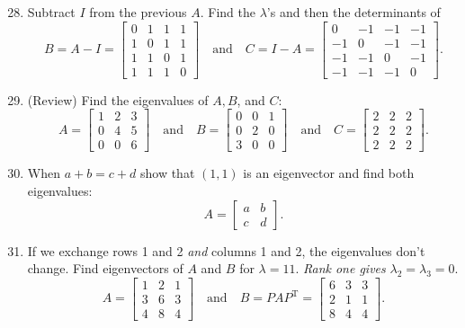 \documentclass[14pt, a4paper]{article}
\begin{document}
\begin{enumerate}
    \setcounter{enumi}{27}
    \item Subtract $I$ from the previous $A$. Find the $\lambda$'s and then the determinants of
          \[
              B = A - I = \begin{bmatrix} 0 & 1 & 1 & 1 \\ 1 & 0 & 1 & 1 \\ 1 & 1 & 0 & 1 \\ 1 & 1 & 1 & 0 \end{bmatrix} \quad \text{and} \quad C = I - A = \begin{bmatrix} 0 & -1 & -1 & -1 \\ -1 & 0 & -1 & -1 \\ -1 & -1 & 0 & -1 \\ -1 & -1 & -1 & 0 \end{bmatrix} .
          \]

    \item (Review) Find the eigenvalues of $A, B$, and $C$:
          \[
              A = \begin{bmatrix} 1 & 2 & 3 \\ 0 & 4 & 5 \\ 0 & 0 & 6 \end{bmatrix} \quad \text{and} \quad B = \begin{bmatrix} 0 & 0 & 1 \\ 0 & 2 & 0 \\ 3 & 0 & 0 \end{bmatrix} \quad \text{and} \quad C = \begin{bmatrix} 2 & 2 & 2 \\ 2 & 2 & 2 \\ 2 & 2 & 2 \end{bmatrix} .
          \]

    \item When $a + b = c + d$ show that $(1, 1)$ is an eigenvector and find both eigenvalues:
          \[
              A = \begin{bmatrix} a & b \\ c & d \end{bmatrix} .
          \]

    \item If we exchange rows 1 and 2 \textit{and} columns 1 and 2, the eigenvalues don't change. Find eigenvectors of $A$ and $B$ for $\lambda = 11$. \textit{Rank one gives} $\lambda_2 = \lambda_3 = 0$.
          \[
              A = \begin{bmatrix} 1 & 2 & 1 \\ 3 & 6 & 3 \\ 4 & 8 & 4 \end{bmatrix} \quad \text{and} \quad B = PAP^{\mathrm{T}} = \begin{bmatrix} 6 & 3 & 3 \\ 2 & 1 & 1 \\ 8 & 4 & 4 \end{bmatrix} .
          \]


\end{enumerate}
\end{document}

